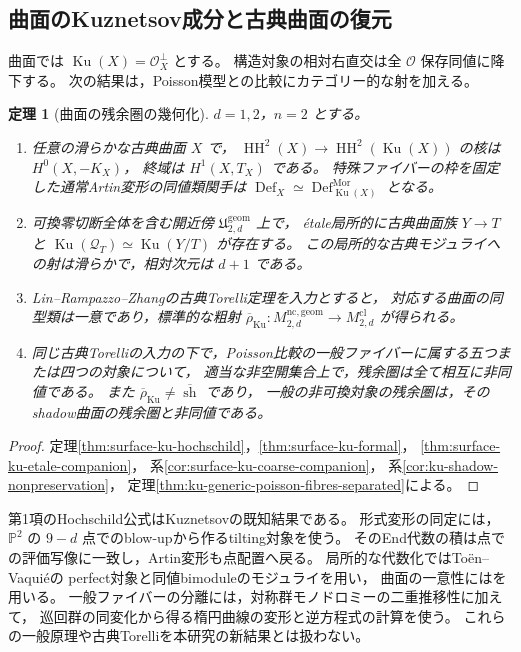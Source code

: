 \documentclass[a4paper,11pt]{ltjsarticle}
\numberwithin{equation}{section}
\theoremstyle{plain}
\newtheorem{theorem}{定理}[section]
\theoremstyle{definition}
\theoremstyle{remark}
\newcommand{\OO}{\mathcal O}
\newcommand{\PP}{\mathbb P}
\newcommand{\Def}{\operatorname{Def}}
\newcommand{\HH}{\operatorname{HH}}
\begin{document}
\subsection{曲面のKuznetsov成分と古典曲面の復元}
曲面では $\operatorname{Ku}(X)=\OO_X^\perp$ とする。
構造対象の相対右直交は全 $\OO$ 保存同値に降下する。
次の結果は，Poisson模型との比較にカテゴリー的な射を加える。
\begin{theorem}[曲面の残余圏の幾何化]
\label{thm:main-surface-ku}
$d=1,2$，$n=2$ とする。
\begin{enumerate}
\item 任意の滑らかな古典曲面 $X$ で，
 $\HH^2(X)\to\HH^2(\operatorname{Ku}(X))$ の核は $H^0(X,-K_X)$，
 終域は $H^1(X,T_X)$ である。
 特殊ファイバーの枠を固定した通常Artin変形の同値類関手は
 $\Def_X\simeq\Def^{\mathrm{Mor}}_{\operatorname{Ku}(X)}$ となる。
\item 可換零切断全体を含む開近傍 $\mathfrak U^{\mathrm{geom}}_{2,d}$ 上で，
 \'{e}tale局所的に古典曲面族 $Y\to T$ と
 $\operatorname{Ku}(\mathcal Q_T)\simeq\operatorname{Ku}(Y/T)$ が存在する。
 この局所的な古典モジュライへの射は滑らかで，相対次元は $d+1$ である。
\item Lin--Rampazzo--Zhangの古典Torelli定理を入力とすると，
 対応する曲面の同型類は一意であり，標準的な粗射
 $\overline\rho_{\mathrm{Ku}}:M^{\mathrm{nc,geom}}_{2,d}\to M^{\mathrm{cl}}_{2,d}$
 が得られる。
\item 同じ古典Torelliの入力の下で，Poisson比較の一般ファイバーに属する五つまたは四つの対象について，
 適当な非空開集合上で，残余圏は全て相互に非同値である。
 また $\overline\rho_{\mathrm{Ku}}\ne\overline{\operatorname{sh}}$ であり，
 一般の非可換対象の残余圏は，そのshadow曲面の残余圏と非同値である。
\end{enumerate}
\end{theorem}
\begin{proof}
定理\ref{thm:surface-ku-hochschild}，\ref{thm:surface-ku-formal}，
\ref{thm:surface-ku-etale-companion}，
系\ref{cor:surface-ku-coarse-companion}，
系\ref{cor:ku-shadow-nonpreservation}，
定理\ref{thm:ku-generic-poisson-fibres-separated}による。
\end{proof}
第1項のHochschild公式はKuznetsov\cite[Theorem~8.5]{KuznetsovHH2009}の既知結果である。
形式変形の同定には，$\PP^2$ の $9-d$ 点でのblow-upから作るtilting対象を使う。
そのEnd代数の積は点での評価写像に一致し，Artin変形も点配置へ戻る。
局所的な代数化ではTo\"en--Vaqui\'e\cite{ToenVaquie2007}の
perfect対象と同値bimoduleのモジュライを用い，
曲面の一意性には\cite[Theorem~1.2]{LinRampazzoZhang2026}を用いる。
一般ファイバーの分離には，対称群モノドロミーの二重推移性に加えて，
巡回群の同変化から得る楕円曲線の変形と逆方程式の計算を使う。
これらの一般原理や古典Torelliを本研究の新結果とは扱わない。
\end{document}

